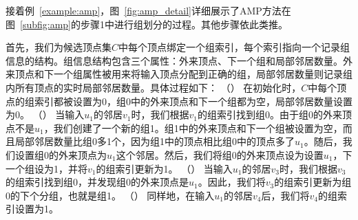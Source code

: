 \begin{example}
  接着例~\ref{example:amp}，图~\ref{fig:amp_detail}详细展示了AMP方法在图~\ref{subfig:amp}的步骤\Num1中进行组划分的过程。其他步骤依此类推。

  首先，我们为候选顶点集$C$中每个顶点绑定一个组索引，每个索引指向一个记录组信息的结构。组信息结构包含三个属性：外来顶点、下一个组和局部邻居数量。外来顶点和下一个组属性被用来将输入顶点分配到正确的组，局部邻居数量则记录组内所有顶点的实时局部邻居数量。具体过程如下：
  （） 在初始化时，$C$中每个顶点的组索引都被设置为0，组0中的外来顶点和下一个组都为空，局部邻居数量设置为0。
  （） 当输入$u_1$的邻居$v_1$时，我们根据$v_1$的组索引找到组0。由于组0的外来顶点不是$u_1$，我们创建了一个新的组1。组1中的外来顶点和下一个组被设置为空，而且局部邻居数量比组0多1个，因为组1中的顶点相比组0中的顶点多了$u_1$。随后，我们设置组0的外来顶点为$u_1$	​这个邻居。然后，我们将组0的外来顶点设为设置$u_1$，下一个组设为1，并将$v_1$的组索引更新为1。
  （） 当输入$u_1$的邻居$v_3$时，我们根据$v_3$的组索引找到组0，并发现组0的外来顶点是$u_1$。因此，我们将$v_3$的组索引更新为组0的下个分组，也就是组1。
  （） 同样地，在输入$u_1$的邻居$v_4$后，我们将$v_4$的组索引设置为1。
  
\end{example}





